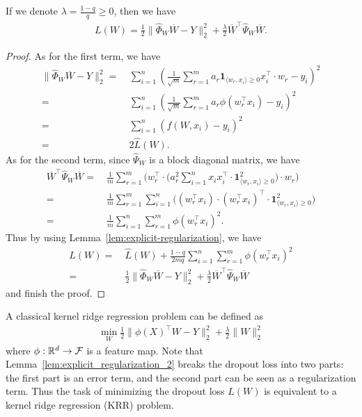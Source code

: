 \begin{lemma}\label{lem:explicit_regularization_2}
If we denote $\lambda = \frac{1-q}{q}\geq 0$, then we have
\begin{align*}
    L(W) = \frac{1}{2}\|\hat{\Phi}_{W} \overline{W} - Y\|_{2}^{2} + \frac{\lambda}{2}\overline{W}^{\top}\hat{\Psi}_{W}\overline{W}.
\end{align*}
\end{lemma}
\begin{proof}
As for the first term, we have
\begin{align*}
    \|\hat{\Phi}_W \overline{W} - Y\|_2^2 = & ~ \sum_{i=1}^n (\frac{1}{\sqrt{m}}\sum_{r=1}^m a_r \mathbf{1}_{\langle w_{r}, x_i \rangle \geq 0} x_i^\top \cdot w_r - y_i)^2 \\
    = & ~ \sum_{i=1}^n (\frac{1}{\sqrt{m}}\sum_{r=1}^m a_r \phi(w_r^\top x_i) - y_i)^2 \\
    = & ~ \sum_{i=1}^n (f(W,x_i) - y_i)^2 \\
    = & ~ 2\hat{L}(W).
\end{align*}
As for the second term, since $\hat{\Psi}_W$ is a block diagonal matrix, we have
\begin{align*}
    \overline{W}^\top \hat{\Psi}_W \overline{W} = & ~ \frac{1}{m}\sum_{r=1}^m \Big(w_r^\top \cdot \big( a_r^2\sum_{i=1}^n x_i x_i^\top \cdot \mathbf{1}_{\langle w_{r}, x_i \rangle \geq 0}^{2}\big) \cdot w_r\Big) \\
    = & ~ \frac{1}{m}\sum_{r=1}^m\sum_{i=1}^n \big((w_r^\top x_i)\cdot(w_r^\top x_i)^\top\cdot \mathbf{1}_{\langle w_{r}, x_i \rangle \geq 0}^{2}\big) \\
    = & ~ \frac{1}{m}\sum_{i=1}^n \sum_{r=1}^m\phi(w_r^\top x_i)^2.
\end{align*}
Thus by using Lemma~\ref{lem:explicit-regularization}, we have
\begin{align*}
    L(W) = & ~ \hat{L}(W) + \frac{1-q}{2mq}\sum_{i=1}^n\sum_{r=1}^m \phi(w_r^\top x_i)^2 \\
    = & ~ \frac{1}{2}\|\hat{\Phi}_{W}\overline{W} - Y\|_{2}^{2} + \frac{\lambda}{2}\overline{W}^{\top}\hat{\Psi}_{W}\overline{W}
\end{align*}
and finish the proof.
\end{proof}

\begin{remark}
A classical kernel ridge regression problem can be defined as
\begin{align*}
    \min_{W} \frac{1}{2} \|\phi(X)^\top W - Y\|_2^2 + \frac{\lambda}{2} \|W\|_2^2
\end{align*}
where $\phi: \mathbb{R}^d \to \mathcal{F}$ is a feature map. Note that Lemma~\ref{lem:explicit_regularization_2} breaks the dropout loss into two parts: the first part is an error term, and the second part can be seen as a regularization term. 
Thus the task of minimizing the dropout loss $L(W)$ is equivalent to a kernel ridge regression (KRR) problem. 
\end{remark}






